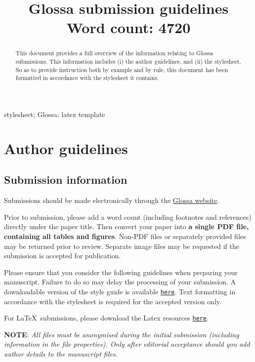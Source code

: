 \documentclass[charis,linguex]{glossa}
\title[Glossa guidelines]{Glossa submission guidelines\\ \bigskip \large Word count: 4720}
\author[Paul \& Vanden Wyngaerd]%
{%
  \spauthor{Waltraud Paul\\ 
  \institute{CRLAO, CNRS-EHESS-INALCO}\\
  \small{%
  waltraud.paul@ehess.fr}
  }
  \AND
  \spauthor{Guido Vanden Wyngaerd \\
  \institute{KU Leuven}\\
  \small{%
  guido.vandenwyngaerd@kuleuven.be}
  }%
}
\begin{document}
\maketitle


\begin{abstract}
This document provides a full overview of the information relating to Glossa submissions. This information includes (i) the author guidelines, and (ii) the stylesheet. So as to provide instruction both by example and by rule, this document has been formatted in accordance with the stylesheet it contains.
\end{abstract}

\begin{keywords}
  stylesheet; Glossa; latex template
\end{keywords}


\section{Author guidelines}
\subsection{Submission information}

Submissions should be made electronically through the \href{https://www.glossa-journal.org}{Glossa website}. 

Prior to submission, please add a word count (including footnotes and references) directly under the paper title. Then convert your paper into \textbf{a single PDF file, containing all tables and figures}. Non-PDF files or separately provided files may be returned prior to review. Separate image files may be requested if the submission is accepted for publication.

Please ensure that you consider the following guidelines when preparing your manuscript. Failure to do so may delay the processing of your submission. A downloadable version of the style guide is available \href{https://github.com/guidovw/Glossalatex/blob/master/glossa-template.pdf}{\texttt{here}}. Text formatting in accordance with  the stylesheet is required for the accepted version only.


For \LaTeX\ submissions, please download the Latex resources \href{https://github.com/guidovw/Glossalatex}{\texttt{here}}.

\textbf{NOTE}: \emph{All files must be anonymised during the initial submission (including information in the file properties). Only after editorial acceptance should you add author details to the manuscript files.} 
\end{document}
